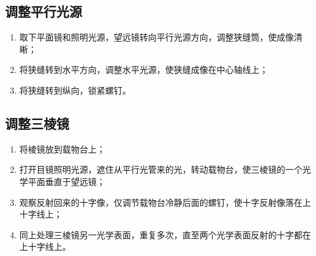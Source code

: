 \documentclass[a4paper]{article}%
\begin{document}
\subsection{调整平行光源}
\begin{enumerate}
    \item 取下平面镜和照明光源，望远镜转向平行光源方向，调整狭缝筒，使成像清晰；
    \item 将狭缝转到水平方向，调整水平光源，使狭缝成像在中心轴线上；
    \item 将狭缝转到纵向，锁紧螺钉。
\end{enumerate}

\subsection{调整三棱镜}
\begin{enumerate}
    \item 将棱镜放到载物台上；
    \item 打开目镜照明光源，遮住从平行光管来的光，转动载物台，使三棱镜的一个光学平面垂直于望远镜；
    \item 观察反射回来的十字像，仅调节载物台冷静后面的螺钉，使十字反射像落在上十字线上；
    \item 同上处理三棱镜另一光学表面，重复多次，直至两个光学表面反射的十字都在上十字线上。
\end{enumerate}
\end{document}
